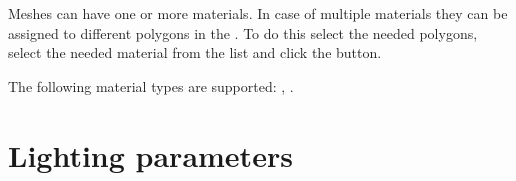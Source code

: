 \documentclass[a4paper,12pt,oneside]{sphinxmanual}
\begin{document}
Meshes can have one or more materials. In case of multiple materials they can be assigned to different polygons in the . To do this select the needed polygons, select the needed material from the list and click the  button.

The following material types are supported: , .


\section{Lighting parameters}
\label{materials:id2}\label{materials:index-1}\label{materials:material-lighting-params}\begin{figure}[htbp]
\centering

\end{figure}
\end{document}
